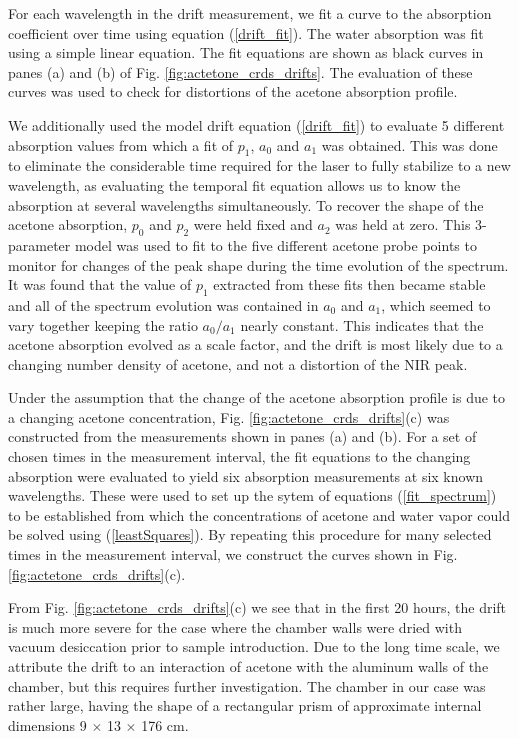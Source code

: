 \documentclass[12pt]{report}
\begin{document}
	For each wavelength in the drift measurement, we fit a curve to the absorption coefficient over time using equation (\ref{drift_fit}). The water absorption was fit using a simple linear equation. The fit equations are shown as black curves in panes (a) and (b) of Fig. \ref{fig:actetone_crds_drifts}. The evaluation of these curves was used to check for distortions of the acetone absorption profile.
	
	We additionally used the model drift equation (\ref{drift_fit}) to evaluate 5 different absorption values from which a fit of $p_1$, $a_0$ and $a_1$ was obtained. This was done to eliminate the considerable time required for the laser to fully stabilize to a new wavelength, as evaluating the temporal fit equation allows us to know the absorption at several wavelengths simultaneously. To recover the shape of the acetone absorption, $p_0$ and $p_2$ were held fixed and $a_2$ was held at zero. This 3-parameter model was used to fit to the five different acetone probe points to monitor for changes of the peak shape during the time evolution of the spectrum. It was found that the value of $p_1$ extracted from these fits then became stable and all of the spectrum evolution was contained in $a_0$ and $a_1$, which seemed to vary together keeping the ratio $a_0/a_1$ nearly constant. This indicates that the acetone absorption evolved as a scale factor, and the drift is most likely due to a changing number density of acetone, and not a distortion of the NIR peak.
	
	Under the assumption that the change of the acetone absorption profile is due to a changing acetone concentration, Fig. \ref{fig:actetone_crds_drifts}(c) was constructed from the measurements shown in panes (a) and (b). For a set of chosen times in the measurement interval, the fit equations to the changing absorption were evaluated to yield six absorption measurements at six known wavelengths. These were used to set up the sytem of equations (\ref{fit_spectrum}) to be established from which the concentrations of acetone and water vapor could be solved using (\ref{leastSquares}). By repeating this procedure for many selected times in the measurement interval, we construct the curves shown in Fig. \ref{fig:actetone_crds_drifts}(c).
	
	From Fig. \ref{fig:actetone_crds_drifts}(c) we see that in the first 20 hours, the drift is much more severe for the case where the chamber walls were dried with vacuum desiccation prior to sample introduction. Due to the long time scale, we attribute the drift to an interaction of acetone with the aluminum walls of the chamber, but this requires further investigation. The chamber in our case was rather large, having the shape of a rectangular prism of approximate internal dimensions 9 $\times$ 13 $\times$ 176 cm.
	
\end{document}
